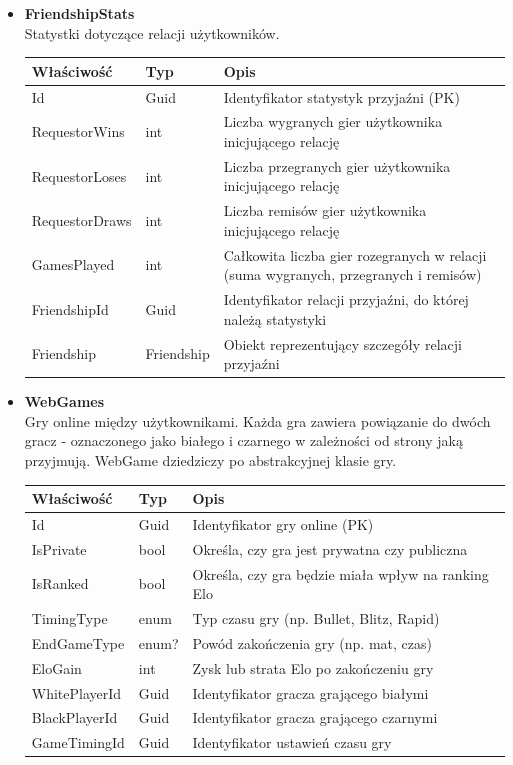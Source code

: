\documentclass[12pt,a4paper]{article}
\begin{document}
\begin{itemize}
    \item \textbf{FriendshipStats}\\
    Statystki dotyczące relacji użytkowników.
    \renewcommand{\arraystretch}{1.5}
    \begin{longtable}{|m{4cm}|m{2cm}|m{8cm}|}
        \hline
        \rowcolor{lightgray}
        \textbf{Właściwość} & \textbf{Typ} & \textbf{Opis} \\ \hline
        \endhead
        \hline
        Id & Guid & Identyfikator statystyk przyjaźni (PK) \\ \hline
        RequestorWins & int & Liczba wygranych gier użytkownika inicjującego relację \\ \hline
        RequestorLoses & int & Liczba przegranych gier użytkownika inicjującego relację \\ \hline
        RequestorDraws & int & Liczba remisów gier użytkownika inicjującego relację \\ \hline
        GamesPlayed & int & Całkowita liczba gier rozegranych w relacji (suma wygranych, przegranych i remisów) \\ \hline
        FriendshipId & Guid & Identyfikator relacji przyjaźni, do której należą statystyki \\ \hline
        Friendship & Friendship & Obiekt reprezentujący szczegóły relacji przyjaźni \\ \hline
    \end{longtable}
  
\newpage
    
    \item \textbf{WebGames}\\
    Gry online między użytkownikami. Każda gra zawiera powiązanie do dwóch gracz - oznaczonego jako białego i czarnego w zależności od strony jaką przyjmują. WebGame dziedziczy po abstrakcyjnej klasie gry.
    \renewcommand{\arraystretch}{1.5}
    \begin{longtable}{|m{4cm}|m{2cm}|m{8cm}|}
        \hline
        \rowcolor{lightgray}
        \textbf{Właściwość} & \textbf{Typ} & \textbf{Opis} \\ \hline
        \endhead
        \hline
        Id & Guid & Identyfikator gry online (PK) \\ \hline
        IsPrivate & bool & Określa, czy gra jest prywatna czy publiczna \\ \hline
        IsRanked & bool & Określa, czy gra będzie miała wpływ na ranking Elo \\ \hline
        TimingType & enum & Typ czasu gry (np. Bullet, Blitz, Rapid) \\ \hline
        EndGameType & enum? & Powód zakończenia gry (np. mat, czas) \\ \hline
        EloGain & int & Zysk lub strata Elo po zakończeniu gry \\ \hline
        WhitePlayerId & Guid & Identyfikator gracza grającego białymi \\ \hline
        BlackPlayerId & Guid & Identyfikator gracza grającego czarnymi \\ \hline
        GameTimingId & Guid & Identyfikator ustawień czasu gry \\ \hline
    \end{longtable}


\end{itemize}
\end{document}

